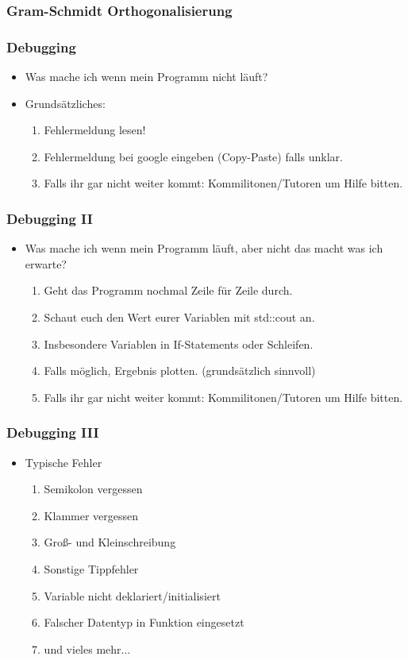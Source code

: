 \documentclass[ignorenonframetext,12pt]{beamer}
\theoremstyle{definition}
\theoremstyle{definition}
\begin{document}
\begin{frame}
\frametitle{Gram-Schmidt Orthogonalisierung}

\end{frame}


\begin{frame}[fragile]
\frametitle{Debugging}
\begin{itemize}
\item Was mache ich wenn mein Programm nicht läuft?
\item Grundsätzliches:
\begin{enumerate}
\item Fehlermeldung lesen!
\item Fehlermeldung bei google eingeben (Copy-Paste) falls unklar.
\item Falls ihr gar nicht weiter kommt: Kommilitonen/Tutoren um Hilfe bitten.
\end{enumerate}
\end{itemize}
\end{frame}

\begin{frame}[fragile]
\frametitle{Debugging II}
\begin{itemize}
\item Was mache ich wenn mein Programm läuft, aber nicht das macht was ich erwarte?
\begin{enumerate}
\item Geht das Programm nochmal Zeile für Zeile durch.
\item Schaut euch den Wert eurer Variablen mit std::cout an.
\item Insbesondere Variablen in If-Statements oder Schleifen.
\item Falls möglich, Ergebnis plotten. (grundsätzlich sinnvoll)
\item Falls ihr gar nicht weiter kommt: Kommilitonen/Tutoren um Hilfe bitten.
\end{enumerate}
\end{itemize}
\end{frame}

\begin{frame}[fragile]
\frametitle{Debugging III}
\begin{itemize}
\item Typische Fehler
\begin{enumerate}
\item Semikolon vergessen
\item Klammer vergessen
\item Gro\ss- und Kleinschreibung
\item Sonstige Tippfehler
\item Variable nicht deklariert/initialisiert
\item Falscher Datentyp in Funktion eingesetzt
\item und vieles mehr...
\end{enumerate}
\end{itemize}
\end{frame}
\end{document}
